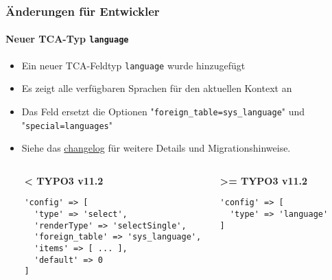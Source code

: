 %

\begin{frame}[fragile]
	\frametitle{Änderungen für Entwickler}
	\framesubtitle{Neuer TCA-Typ \texttt{language}}


	\begin{itemize}
		\item Ein neuer TCA-Feldtyp \texttt{language} wurde hinzugefügt
		\item Es zeigt alle verfügbaren Sprachen für den aktuellen Kontext an
		\item Das Feld ersetzt die Optionen\newline
			"\texttt{foreign\_table=sys\_language}"
			und
			"\texttt{special=languages}"
		\item Siehe das
			\href{https://docs.typo3.org/c/typo3/cms-core/master/en-us/Changelog/master/Feature-57082-NewTCATypeLanguage.html}{changelog}
			für weitere Details und Migrationshinweise.
	\end{itemize}


	\vspace{0.2cm}
	\begin{columns}[T]
			\begin{column}{.1\textwidth}
			\end{column}
			\begin{column}{.4\textwidth}
			\smaller\textbf{< TYPO3 v11.2}\normalsize
\begin{lstlisting}
'config' => [
  'type' => 'select',
  'renderType' => 'selectSingle',
  'foreign_table' => 'sys_language',
  'items' => [ ... ],
  'default' => 0
]
\end{lstlisting}
			\end{column}
			\begin{column}{.4\textwidth}
			\smaller\textbf{>= TYPO3 v11.2}\normalsize
\begin{lstlisting}
'config' => [
  'type' => 'language'
]
\end{lstlisting}
			\end{column}
			\begin{column}{.1\textwidth}
			\end{column}
	\end{columns}

\end{frame}

